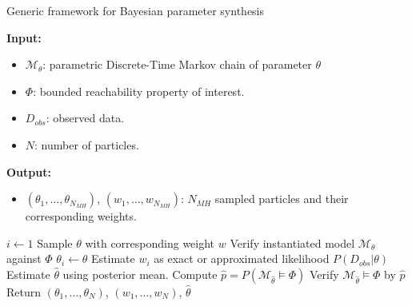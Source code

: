 \begin{algorithm}[H]
    \caption{Generic framework for Bayesian parameter synthesis}
    \label{alg:generic-framework}
    \footnotesize{
        \hspace*{\algorithmicindent} \textbf{Input:}
        \begin{itemize}[noitemsep,topsep=0pt]
            \item $\mathcal{M}_\theta$: parametric Discrete-Time Markov chain of parameter $\theta$
            \item $\Phi$: bounded reachability property of interest.
            \item $D_{obs}$: observed data.
            \item $N$: number of particles.
        \end{itemize}
        \hspace*{\algorithmicindent} \textbf{Output:}
        \begin{itemize}[noitemsep,topsep=0pt]
            \item $(\theta_1,\ldots,\theta_{N_{MH}})$, $(w_1,\ldots,w_{N_{MH}})$: $N_{MH}$ sampled
                  particles and their corresponding weights.
        \end{itemize}
    }
    \begin{algorithmic}[1]
        \State $i \leftarrow 1$
        \State Sample $\theta$ with corresponding weight $w$
        \State Verify instantiated model $\mathcal{M}_\theta$ against $\Phi$
        \State $\theta_i \leftarrow \theta$
        \State Estimate $w_i$ as exact or approximated likelihood $P(D_{obs}|\theta)$
        \EndIf
        \EndWhile
        \State Estimate $\hat{\theta}$ using posterior mean.
        \State Compute $\hat{p}=P(\mathcal{M}_{\hat{\theta}}\models\Phi)$
        \State Verify $\mathcal{M}_{\hat{\theta}} \models\Phi$ by $\hat{p}$
        \State Return $(\theta_1,\ldots,\theta_{N})$, $(w_1,\ldots,w_{N})$, $\hat{\theta}$
        \EndProcedure
    \end{algorithmic}
\end{algorithm}

